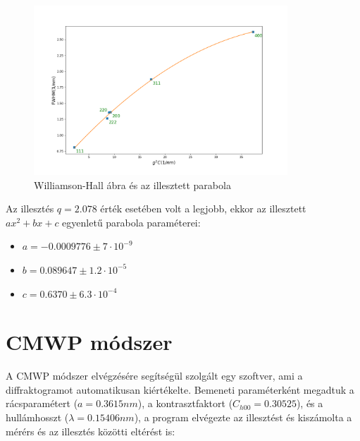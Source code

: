\documentclass[12pt]{article}
\theoremstyle{plain}
\begin{document}
\begin{figure}[H]
	\begin{center}
		\includegraphics[width=0.85\textwidth]{./xray-lab/wh2.png}
		\caption{Williamson-Hall ábra és az illesztett parabola}
	\end{center}
	\label{fig:wh_}
\end{figure}

\vspace{.2cm}

\par Az illesztés $q=2.078$ érték esetében volt a legjobb, ekkor az illesztett $ax^2+bx+c$ egyenletű parabola paraméterei:

\vspace{.2cm}

\begin{itemize}
	\item $a=-0.0009776\pm7\cdot10^{-9}$
	\item $b=0.089647\pm1.2\cdot10^{-5}$
	\item $c=0.6370\pm6.3\cdot10^{-4}$
\end{itemize}

\section{CMWP módszer}

\vspace{.3cm}

\par A CMWP módszer elvégzésére segítségül szolgált egy szoftver, ami a diffraktogramot automatikusan kiértékelte.
Bemeneti paraméterként megadtuk a rácsparamétert ($a=0.3615nm$), a kontrasztfaktort ($C_{h00}=0.30525$),
és a hullámhosszt ($\lambda=0.15406nm$), a program elvégezte az illesztést és kiszámolta a mérérs és az illesztés közötti eltérést is:
\end{document}
